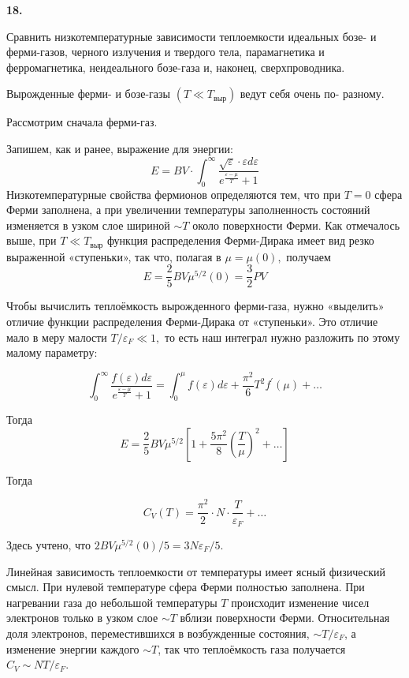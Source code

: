 \documentclass[a4paper,12pt]{article} %
\begin{document}
\begin{ttask}\textbf{18. }

Сравнить низкотемпературные зависимости теплоемкости идеальных бозе- и ферми-газов, 
черного излучения и твердого тела, 
парамагнетика и ферромагнетика, 
неидеального бозе-газа и, наконец, сверхпроводника. 



Вырожденные ферми- и бозе-газы $\left(T \ll T_{\text {выр}}\right)$ ведут себя очень по-
разному. 

Рассмотрим сначала ферми-газ. 

Запишем, как и ранее, выражение для энергии:
$$
E=B V \cdot \int_{0}^{\infty} 
\frac{\sqrt{\varepsilon} \cdot \varepsilon d \varepsilon}{e^{\frac{\varepsilon-\mu}{T}}+1}
$$
Низкотемпературные свойства фермионов определяются тем, 
что при $T=0$ сфера Ферми заполнена, а при увеличении температуры заполненность состояний изменяется 
в узком слое шириной $\sim T$ около поверхности Ферми. 
Как отмечалось выше, при $T \ll T_{\text {выр}}$ функция распределения Ферми-Дирака 
имеет вид резко выраженной «ступеньки», так что, полагая в $\mu=\mu(0),$ получаем
$$
E=
\frac{2}{5} B V \mu^{5 / 2}(0)
=
\frac{3}{2}PV
$$


Чтобы вычислить теплоёмкость вырожденного ферми-газа, 
нужно «выделить» отличие функции распределения Ферми-Дирака от «ступеньки». 
Это отличие мало в меру малости $T / \varepsilon_{F} \ll 1,$ то есть наш интеграл нужно разложить по этому малому параметру:

$$
\int_{0}^{\infty} \frac{f(\varepsilon) d \varepsilon}{e^{\frac{\varepsilon-\mu}{T}}+1}=\int_{0}^{\mu} f(\varepsilon) d \varepsilon+\frac{\pi^{2}}{6} T^{2} f^{\prime}(\mu)+\ldots
$$

Тогда
$$
E=\frac{2}{5} B V \mu^{5 / 2}
\left[
1
+
\frac{5 \pi^{2}}{8}\left(\frac{T}{\mu}\right)^{2}
+
\ldots
\right]
$$


Тогда


\[ C_{V}(T)=\frac{\pi^{2}}{2} \cdot N \cdot \frac{T}{\varepsilon_{F}}+\ldots \]



Здесь учтено, что  $2 B V \mu^{5 / 2}(0) / 5=3 N \varepsilon_{F} / 5$. 

Линейная зависимость теплоемкости от температуры имеет ясный физический смысл. 
При нулевой температуре сфера Ферми полностью заполнена. 
При нагревании газа до небольшой температуры $T$ происходит изменение чисел электронов только в узком слое $\sim T$ вблизи поверхности Ферми. 
Относительная доля электронов, переместившихся в возбужденные состояния, $\sim T / \varepsilon_{F}$, а изменение энергии каждого $\sim T$, 
так что теплоёмкость газа получается $C_{V} \sim N T / \varepsilon_{F}$.







\end{ttask}
\end{document}
